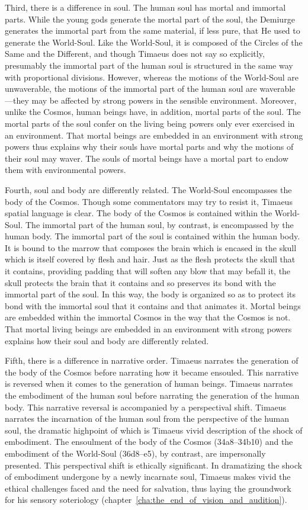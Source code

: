 Third, there is a difference in soul. The human soul has mortal and immortal parts. While the young gods generate the mortal part of the soul, the Demiurge generates the immortal part from the same material, if less pure, that He used to generate the World-Soul. Like the World-Soul, it is composed of the Circles of the Same and the Different, and though Timaeus does not say so explicitly, presumably the immortal part of the human soul is structured in the same way with proportional divisions. However, whereas the motions of the World-Soul are unwaverable, the motions of the immortal part of the human soul are waverable---they may be affected by strong powers in the sensible environment. Moreover, unlike the Cosmos, human beings have, in addition, mortal parts of the soul. The mortal parts of the soul confer on the living being powers only ever exercised in an environment. That mortal beings are embedded in an environment with strong powers thus explains why their souls have mortal parts and why the motions of their soul may waver. The souls of mortal beings have a mortal part to endow them with environmental powers.

Fourth, soul and body are differently related. The World-Soul encompasses the body of the Cosmos. Though some commentators may try to resist it, Timaeus spatial language is clear. The body of the Cosmos is contained within the World-Soul. The immortal part of the human soul, by contrast, is encompassed by the human body. The immortal part of the soul is contained within the human body. It is bound to the marrow that composes the brain which is encased in the skull which is itself covered by flesh and hair. Just as the flesh protects the skull that it contains, providing padding that will soften any blow that may befall it, the skull protects the brain that it contains and so preserves its bond with the immortal part of the soul. In this way, the body is organized so as to protect its bond with the immortal soul that it contains and that animates it. Mortal beings are embedded within the immortal Cosmos in the way that the Cosmos is not. That mortal living beings are embedded in an environment with strong powers explains how their soul and body are differently related.

Fifth, there is a difference in narrative order. Timaeus narrates the generation of the body of the Cosmos before narrating how it became ensouled. This narrative is reversed when it comes to the generation of human beings. Timaeus narrates the embodiment of the human soul before narrating the generation of the human body. This narrative reversal is accompanied by a perspectival shift. Timaeus narrates the incarnation of the human soul from the perspective of the human soul, the dramatic highpoint of which is Timaeus vivid description of the shock of embodiment. The ensoulment of the body of the Cosmos (34a8--34b10) and the embodiment of the World-Soul (36d8--e5), by contrast, are impersonally presented. This perspectival shift is ethically significant. In dramatizing the shock of embodiment undergone by a newly incarnate soul, Timaeus makes vivid the ethical challenges faced and the need for salvation, thus laying the groundwork for his sensory soteriology (chapter~\ref{cha:the_end_of_vision_and_audition}).

